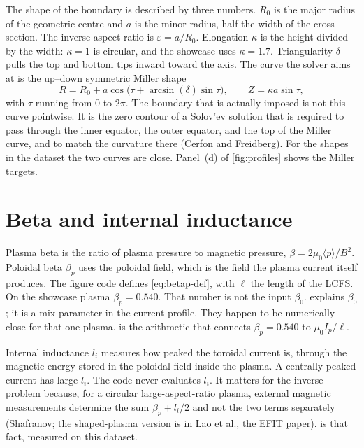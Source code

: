 \documentclass[11pt,a4paper,oneside,openany]{book}
\numberwithin{equation}{chapter}
\newcommand{\Ip}{I_{p}}
\theoremstyle{definition}
\begin{document}
The shape of the boundary is described by three numbers. \(R_{0}\) is the major radius of the geometric centre and \(a\) is the minor radius, half the width of the cross-section. The inverse aspect ratio is \(\varepsilon=a/R_{0}\). Elongation \(\kappa\) is the height divided by the width: \(\kappa=1\) is circular, and the showcase uses \(\kappa=1.7\). Triangularity \(\delta\) pulls the top and bottom tips inward toward the axis. The curve the solver aims at is the up--down symmetric Miller shape
\begin{equation}
\label{eq:miller}
R=R_{0}+a\cos\bigl(\tau+\arcsin(\delta)\sin\tau\bigr),
\qquad
Z=\kappa a\sin\tau,
\end{equation}
with \(\tau\) running from \(0\) to \(2\pi\). The boundary that is actually imposed is not this curve pointwise. It is the zero contour of a Solov'ev solution that is required to pass through the inner equator, the outer equator, and the top of the Miller curve, and to match the curvature there (Cerfon and Freidberg). For the shapes in the dataset the two curves are close. Panel~(d) of \cref{fig:profiles} shows the Miller targets.

\section{Beta and internal inductance}

Plasma beta is the ratio of plasma pressure to magnetic pressure, \(\beta=2\mu_{0}\langle p\rangle/B^{2}\). Poloidal beta \(\beta_{p}\) uses the poloidal field, which is the field the plasma current itself produces. The figure code defines \eqref{eq:betap-def}, with \(\ell\) the length of the LCFS. On the showcase plasma \(\beta_{p}=0.540\). That number is not the input \(\beta_{0}\).  explains \(\beta_{0}\); it is a mix parameter in the current profile. They happen to be numerically close for that one plasma.  is the arithmetic that connects \(\beta_{p}=0.540\) to \(\mu_{0}\Ip/\ell\).

Internal inductance \(l_{i}\) measures how peaked the toroidal current is, through the magnetic energy stored in the poloidal field inside the plasma. A centrally peaked current has large \(l_{i}\). The code never evaluates \(l_{i}\). It matters for the inverse problem because, for a circular large-aspect-ratio plasma, external magnetic measurements determine the sum \(\beta_{p}+l_{i}/2\) and not the two terms separately (Shafranov; the shaped-plasma version is in Lao et al., the EFIT paper).  is that fact, measured on this dataset.
\end{document}
